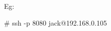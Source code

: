 \begin{flushleft}
\begin{itemize}
\begin{itemize}
		Eg:
		\begin{tcolorbox}[breakable,notitle,boxrule=-0pt,colback=black,colframe=black]
			\color{green}
			\font=9pt
			\# ssh -p 8080 jack@192.168.0.105
			\font=4pt
		\end{tcolorbox}
		
	\end{itemize}
	
	
	
	
	
	
\end{itemize}





\end{flushleft}
\newpage


